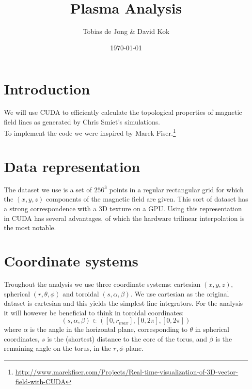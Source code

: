 \documentclass{article}
\begin{document}
\title{Plasma Analysis}
\author{Tobias de Jong \& David Kok}
\date{\today}
\maketitle
\section{Introduction}
We will use CUDA to efficiently calculate the topological properties of magnetic field lines as generated by Chris Smiet's simulations.\cite{PhysRevLett.115.095001}\\
To implement the code we were inspired by Marek Fiser.\footnote{\url{http://www.marekfiser.com/Projects/Real-time-visualization-of-3D-vector-field-with-CUDA}}
\section{Data representation}
The dataset we use is a set of $256^3$ points in a regular rectangular grid for which the $(x,y,z)$ components of the magnetic field are given. This sort of dataset has a strong correspondence with a 3D texture on a GPU. Using this representation in CUDA has several advantages, of which the hardware trilinear interpolation is the most notable.
\section{Coordinate systems}
Troughout the analysis we use three coordinate systems: cartesian $(x,y,z)$, spherical $(r,\theta,\phi)$ and toroidal $(s,\alpha, \beta)$. We use cartesian as the original dataset is cartesian and this yields the simplest line integrators. For the analysis it will however be beneficial to think in toroidal coordinates:
\[(s,\alpha,\beta)\in ([0,r_{max}],[0,2\pi],[0,2\pi])\]
where $\alpha$ is the angle in the horizontal plane, corresponding to $\theta$ in spherical coordinates, $s$ is the (shortest) distance to the core of the torus, and $\beta$ is the remaining angle on the torus, in the $r,\phi$-plane.
\end{document}
